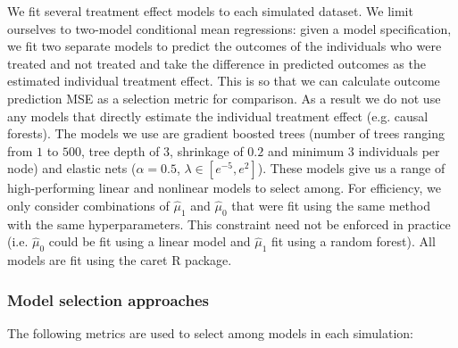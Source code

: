 We fit several treatment effect models to each simulated dataset. We limit ourselves to two-model conditional mean regressions: given a model specification, we fit two separate models to predict the outcomes of the individuals who were treated and not treated and take the difference in predicted outcomes as the estimated individual treatment effect. This is so that we can calculate outcome prediction MSE as a selection metric for comparison. As a result we do not use any models that directly estimate the individual treatment effect (e.g. causal forests). The models we use are gradient boosted trees (number of trees ranging from $1$ to $500$, tree depth of $3$, shrinkage of $0.2$ and minimum $3$ individuals per node) and elastic nets ($\alpha=0.5$, $\lambda \in [e^{-5}, e^2]$). These models give us a range of high-performing linear and nonlinear models to select among. For efficiency, we only consider combinations of $\hat\mu_1$ and $\hat\mu_0$ that were fit using the same method with the same hyperparameters. This constraint need not be enforced in practice (i.e. $\hat\mu_0$ could be fit using a linear model and $\hat\mu_1$ fit using a random forest). All models are fit using the caret R package.

\subsubsection{Model selection approaches}

The following metrics are used to select among models in each simulation:


